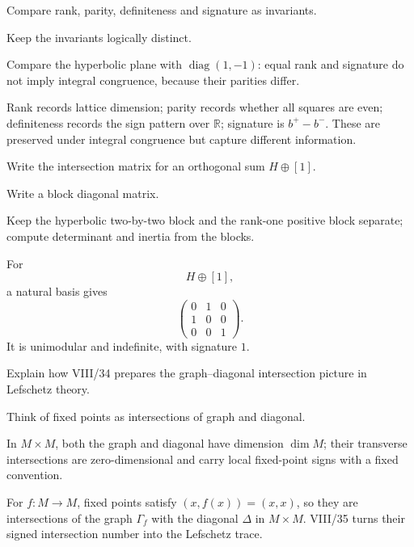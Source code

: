\begin{exercise}\label{exr:viii34-22}
Compare rank, parity, definiteness and signature as invariants.
\end{exercise}
\begin{hint}
Keep the invariants logically distinct.

Compare the hyperbolic plane with \(\operatorname{diag}(1,-1)\): equal rank and signature do not imply integral congruence, because their parities differ.
\end{hint}
\begin{solution}
Rank records lattice dimension; parity records whether all squares are even; definiteness records the sign pattern over \(\mathbb R\); signature is \(b^+-b^-\). These are preserved under integral congruence but capture different information.
\end{solution}

\begin{exercise}\label{exr:viii34-23}
Write the intersection matrix for an orthogonal sum $H\oplus[1]$.
\end{exercise}
\begin{hint}
Write a block diagonal matrix.

Keep the hyperbolic two-by-two block and the rank-one positive block separate; compute determinant and inertia from the blocks.
\end{hint}
\begin{solution}
For
\[
H\oplus[1],
\]
a natural basis gives
\[
\begin{pmatrix}
0&1&0\\
1&0&0\\
0&0&1
\end{pmatrix}.
\]
It is unimodular and indefinite, with signature \(1\).
\end{solution}

\begin{exercise}\label{exr:viii34-24}
Explain how VIII/34 prepares the graph--diagonal intersection picture in Lefschetz theory.
\end{exercise}
\begin{hint}
Think of fixed points as intersections of graph and diagonal.

In \(M\times M\), both the graph and diagonal have dimension \(\dim M\); their transverse intersections are zero-dimensional and carry local fixed-point signs with a fixed convention.
\end{hint}
\begin{solution}
For \(f:M\to M\), fixed points satisfy \((x,f(x))=(x,x)\), so they are intersections of the graph \(\Gamma_f\) with the diagonal \(\Delta\) in \(M\times M\). VIII/35 turns their signed intersection number into the Lefschetz trace.
\end{solution}
